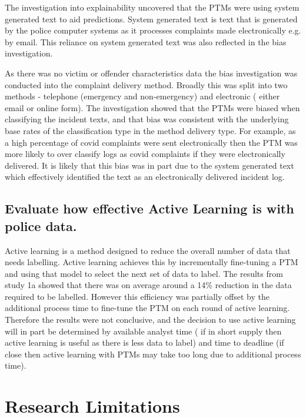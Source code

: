 The investigation into explainability uncovered that the PTMs were using system generated text to aid predictions. System generated text is text that is generated by the police computer systems as it processes complaints made electronically e.g. by email. This reliance on system generated text was also reflected in the bias investigation.

As there was no victim or offender characteristics data the bias investigation was conducted into the complaint delivery method. Broadly this was split into two methods - telephone (emergency and non-emergency) and electronic ( either email or online form). The investigation showed that the PTMs were biased when classifying the incident texts, and that bias was consistent with the underlying base rates of the classification type in the method delivery type. For example, as a high percentage of covid complaints were sent electronically then the PTM was more likely to over classify logs as covid complaints if they were electronically delivered.  It is likely that this bias was in part due to the system generated text which effectively identified the text as an electronically delivered incident log.

\subsection{Evaluate how effective Active Learning is with police data.}  Active learning is a method designed to reduce the overall number of data that needs labelling. Active learning achieves this by incrementally fine-tuning a PTM and using that model to select the next set of data to label. The results from study 1a showed that there was on average around a 14\% reduction in the data required to be labelled. However this efficiency was partially offset by the additional process time to fine-tune the PTM on each round of active learning. Therefore the results were not conclusive, and the decision to use active learning will in part be determined by available analyst time ( if in short supply then active learning is useful as there is less data to label)  and time to deadline (if close then active learning with PTMs may take too long due to additional process time).




\section{Research Limitations}



